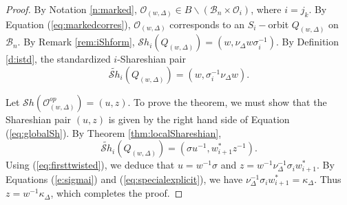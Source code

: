 \documentclass[12pt]{amsart}
\numberwithin{equation}{section}
\newcommand{\B}{\mathcal{B}}
\newcommand{\Sh}{\mathcal{S}h}
\begin{document}
\begin{proof}
By Notation \ref{n:marked}, $\mathcal{O}_{(w,\Delta)}\in B\backslash (\B_{n}\times \mathcal{O}_{i})$, where $i=j_{k}$.  By  Equation (\ref{eq:markedcorres}), $\mathcal{O}_{(w,\Delta)}$ corresponds to an $S_{i}-$orbit $Q_{(w,\Delta)}$ on $\B_{n}.$  By  Remark \ref{rem:iShform}, $\Sh_{i}(Q_{(w,\Delta)})=(w, \nu_{\Delta} w\sigma_{i}^{-1}).$
  By Definition \ref{d:istd}, 
 the standardized $i$-Shareshian pair 
\begin{equation}\label{eq:firsttwisted}
\widetilde{\Sh}_{i}(Q_{(w,\Delta)})=(w, \sigma_{i}^{-1}\nu_{\Delta} w).
\end{equation}
 
Let $\Sh(\mathcal{O}_{(w,\Delta)}^{op})=(u,z)$.  To prove the theorem, we must show that the Shareshian pair $(u,z)$ is given by the right hand side of Equation (\ref{eq:globalSh}).  By Theorem \ref{thm:localShareshian}, 
 \begin{equation}\label{eq:secondtwisted}
 \widetilde{\Sh}_{i}(Q_{(w,\Delta)})=(\sigma u^{-1}, w_{i+1}^{*} z^{-1}).
 \end{equation}
  Using (\ref{eq:firsttwisted}), we deduce that $u=w^{-1}\sigma$ and  $z=w^{-1}\nu_{\Delta}^{-1} \sigma_{i} w_{i+1}^{*}$.  
By Equations (\ref{e:sigmai}) and (\ref{eq:specialexplicit}), we have $\nu_{\Delta}^{-1} \sigma_{i} w_{i+1}^{*}=\kappa_{\Delta}.$
Thus $z=w^{-1}\kappa_{\Delta}$, which completes the proof.
\end{proof}
\end{document}
